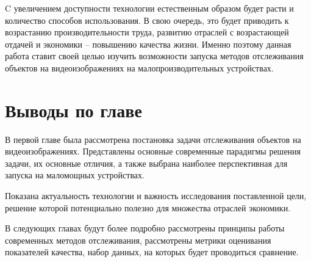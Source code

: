 C увеличением доступности технологии естественным образом будет расти и количество способов использования. 
В свою очередь, это будет приводить к возрастанию производительности труда, развитию отраслей с возрастающей отдачей и экономики -- повышению качества жизни.
Именно поэтому данная работа ставит своей целью изучить возможности запуска методов отслеживания объектов на видеоизображениях на малопроизводительных устройствах. 

\section{Выводы по главе}
В первой главе была рассмотрена постановка задачи отслеживания объектов на видеоизображениях. Представлены основные современные парадигмы решения задачи,
их основные отличия, а также выбрана наиболее перспективная для запуска на маломощных устройствах. 

Показана актуальность технологии и важность исследования поставленной цели, решение которой потенциально полезно для множества отраслей экономики.

В следующих главах будут более подробно рассмотрены принципы работы современных методов отслеживания, рассмотрены метрики оценивания показателей качества, набор данных, на которых будет проводиться сравнение.
